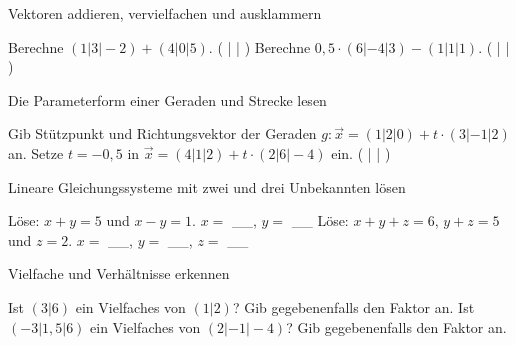 \setcounter{aufgabe}{0}

\begin{aufgabe}{Vektoren addieren, vervielfachen und ausklammern}
\begin{teile}
\teil Berechne $(1 | 3 | -2) + (4 | 0 | 5)$. ( \leerfeld | \leerfeld | \leerfeld )
\teil Berechne $0{,}5 \cdot (6 | -4 | 3) - (1 | 1 | 1)$. ( \leerfeld | \leerfeld | \leerfeld )
\end{teile}
\end{aufgabe}

\begin{aufgabe}{Die Parameterform einer Geraden und Strecke lesen}
\begin{teile}
\teil Gib Stützpunkt und Richtungsvektor der Geraden $g: \vec{x} = (1 | 2 | 0) + t \cdot (3 | -1 | 2)$ an.
\teil Setze $t = -0{,}5$ in $\vec{x} = (4 | 1 | 2) + t \cdot (2 | 6 | -4)$ ein. ( \leerfeld | \leerfeld | \leerfeld )
\end{teile}
\end{aufgabe}

\begin{aufgabe}{Lineare Gleichungssysteme mit zwei und drei Unbekannten lösen}
\begin{teile}
\teil Löse: $x + y = 5$ und $x - y = 1$. $x =$ \_\_, $y =$ \_\_
\teil Löse: $x + y + z = 6$, $y + z = 5$ und $z = 2$. $x =$ \_\_, $y =$ \_\_, $z =$ \_\_
\end{teile}
\end{aufgabe}

\begin{aufgabe}{Vielfache und Verhältnisse erkennen}
\begin{teile}
\teil Ist $(3 | 6)$ ein Vielfaches von $(1 | 2)$? Gib gegebenenfalls den Faktor an.
\teil Ist $(-3 | 1{,}5 | 6)$ ein Vielfaches von $(2 | -1 | -4)$? Gib gegebenenfalls den Faktor an.
\end{teile}
\end{aufgabe}

